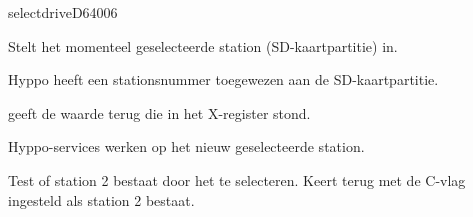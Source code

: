 \newpage
\begin{hyppotrap}{selectdrive}{D640}{06}

\item [Dienst:]  Stelt het momenteel geselecteerde station (SD-kaartpartitie) in.
\item [Voorbeding:]  Hyppo heeft een stationsnummer toegewezen aan de SD-kaartpartitie.
\item [Invoer:]  
\item [Nawerking:]   geeft de waarde terug die in het X-register stond.

  Hyppo-services werken op het nieuw geselecteerde station.
\item [Foutcodes:]  
\item [Geschiedenis:]
\item [Voorbeeld:]  Test of station 2 bestaat door het te selecteren. Keert terug met de C-vlag ingesteld als  station 2 bestaat.
\end{hyppotrap}


